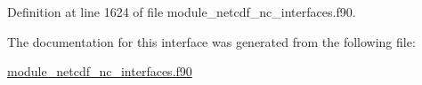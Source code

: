 Definition at line 1624 of file module\+\_\+netcdf\+\_\+nc\+\_\+interfaces.\+f90.



The documentation for this interface was generated from the following file\+:\begin{DoxyCompactItemize}
\item 
\hyperlink{module__netcdf__nc__interfaces_8f90}{module\+\_\+netcdf\+\_\+nc\+\_\+interfaces.\+f90}\end{DoxyCompactItemize}
